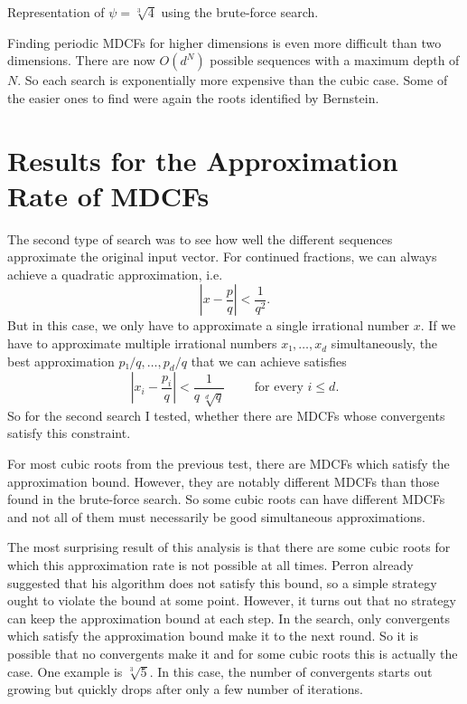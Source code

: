 \begin{table}[tbp]
  \caption{Representation of $ψ = \sqrt[3]{4}$ using the brute-force search.}
  \label{table:cube-root-4}
  \centering
  \footnotesize
  
\end{table}

Finding periodic MDCFs for higher dimensions is even more difficult than two dimensions.
There are now $O(d^N)$ possible sequences with a maximum depth of $N$.
So each search is exponentially more expensive than the cubic case.
Some of the easier ones to find were again the roots identified by Bernstein.

\section{Results for the Approximation Rate of MDCFs}

The second type of search was to see how well the different sequences
approximate the original input vector.
For continued fractions, we can always achieve a quadratic approximation, i.e.
\[
  \left| x - \frac{p}{q} \right| < \frac{1}{q^2}.
\]
But in this case, we only have to approximate a single irrational number $x$.
If we have to approximate multiple irrational numbers $x₁, …, x_d$ simultaneously,
the best approximation $p₁/q, …, p_d/q$ that we can achieve satisfies
\[
  \left|x_i - \frac{p_i}{q}\right| < \frac{1}{q \, \sqrt[d]{q}} \qquad \text{ for every } i ≤ d.
\]
So for the second search I tested, whether there are MDCFs whose convergents
satisfy this constraint.

For most cubic roots from the previous test,
there are MDCFs which satisfy the approximation bound.
However, they are notably different MDCFs than those found in the brute-force
search.
So some cubic roots can have different MDCFs
and not all of them must necessarily be good simultaneous approximations.

The most surprising result of this analysis is that there are some cubic roots
for which this approximation rate is not possible at all times.
Perron already suggested that his algorithm does not satisfy this bound,
so a simple strategy ought to violate the bound at some point.
However, it turns out that no strategy can keep the approximation bound at each step.
In the search, only convergents which satisfy the approximation bound make it to the next round.
So it is possible that no convergents make it and for some cubic roots this is actually the case.
One example is $\sqrt[3]{5}$.
In this case, the number of convergents starts out growing but quickly drops
after only a few number of iterations.

